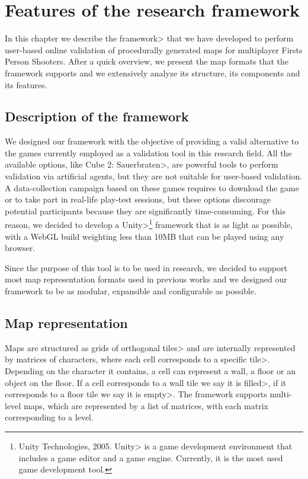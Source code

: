 \chapter{Features of the research framework}


In this chapter we describe the \<framework> that we have developed to perform user-based online validation of procedurally generated maps for multiplayer Firsts Person Shooters. After a quick overview, we present the map formats that the framework supports and we extensively analyze its structure, its components and its features.


\section{Description of the framework}

We designed our framework with the objective of providing a valid alternative to the games currently employed as a validation tool in this research field. All the available options, like \<Cube 2: Sauerbraten>, are powerful tools to perform validation via artificial agents, but they are not suitable for user-based validation. A data-collection campaign based on these games requires to download the game or to take part in real-life play-test sessions, but these options discourage potential participants because they are significantly time-consuming. For this reason, we decided to develop a \<Unity>\footnote{Unity Technologies, 2005. \<Unity> is a game development environment that includes a game editor and a game engine. Currently, it is the most used game development tool.} framework that is as light as possible, with a WebGL build weighting less than 10MB that can be played using any browser.

\par

Since the purpose of this tool is to be used in research, we decided to support most map representation formats used in previous works and we designed our framework to be as modular, expansible and configurable as possible.


\section{Map representation}

Maps are structured as grids of orthogonal \<tiles> and are internally represented  by matrices of characters, where each cell corresponds to a specific \<tile>. Depending on the character it contains, a cell can represent a wall, a floor or an object on the floor. If a cell corresponds to a wall tile we say it is \<filled>, if it corresponds to a floor tile we say it is \<empty>. The framework supports multi-level maps, which are represented by a list of matrices, with each matrix corresponding to a level.

